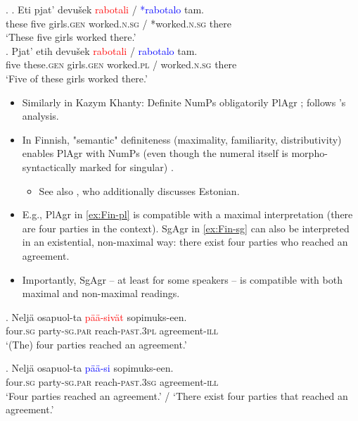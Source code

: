 \ex.
\ag. Eti pjat' devušek \textcolor{red}{rabotali} / \textcolor{blue}{*rabotalo} tam.\\
     these five girls.\textsc{gen} worked.\textsc{n.sg} / *worked.\textsc{n.sg} there\\
    \glt `These five girls worked there.'\\
\bg. Pjat' etih devušek \textcolor{red}{rabotali} / \textcolor{blue}{rabotalo} tam.\\
     five these.\textsc{gen} girls.\textsc{gen} worked.\textsc{pl} / worked.\textsc{n.sg} there\\
    \glt `Five of these girls worked there.'

\begin{itemize}
    \item Similarly in Kazym Khanty: Definite NumPs obligatorily PlAgr \citep{Pisarenko2024}; \citet{Pisarenko2024} follows \citet{Pereltsvaig2006}'s analysis.
\end{itemize}

\begin{itemize}
    \item In Finnish, "semantic" definiteness (maximality, familiarity, distributivity) enables PlAgr with NumPs (even though the numeral itself is morpho-syntactically marked for singular) \citep{Kaiser2022salt, Kaiser2022short}.
    \begin{itemize}
        \item See also \citet{Norris2021}, who additionally discusses Estonian.
    \end{itemize}
    \item E.g., PlAgr in \ref{ex:Fin-pl} is compatible with a maximal interpretation (there are four parties in the context). SgAgr in \ref{ex:Fin-sg} can also be interpreted in an existential, non-maximal way: there exist four parties who reached an agreement.
    \item Importantly, SgAgr -- at least for some speakers -- is compatible with both maximal and non-maximal readings.
\end{itemize}

\ex.
\gll Neljä osapuol-ta \textcolor{red}{pää-sivät} sopimuks-een.\\
     four.\textsc{sg} party-\textsc{sg.par} reach-\textsc{past.3pl} agreement-\textsc{ill}\\
\glt `(The) four parties reached an agreement.' \label{ex:Fin-pl}

\ex.
\gll Neljä osapuol-ta \textcolor{blue}{pää-si} sopimuks-een.\\
     four.\textsc{sg} party-\textsc{sg.par} reach-\textsc{past.3sg} agreement-\textsc{ill}\\
\glt `Four parties reached an agreement.' / `There exist four parties that reached an agreement.' \label{ex:Fin-sg}


